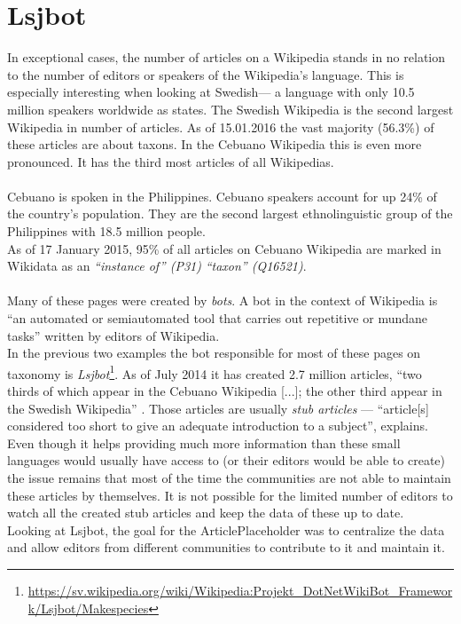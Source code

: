 \section{Lsjbot}
In exceptional cases, the number of articles on a Wikipedia stands in no relation to the number of editors or speakers of the Wikipedia's language. This is especially interesting when looking at Swedish--- a language with only 10.5 million speakers worldwide as \citet{nlpd:01} states. The Swedish Wikipedia is the second largest Wikipedia in number of articles. As of 15.01.2016 the vast majority (56.3\%) of these articles are about taxons.
In the Cebuano Wikipedia this is even more pronounced. It has the third most articles of all Wikipedias. \citep{wiki:07} \\
\\
Cebuano is spoken in the Philippines. Cebuano speakers account for up 24\% of the country's population. \citep{cebuano:01} They are the second largest ethnolinguistic group of the Philippines with 18.5 million people. \citep{cebuano:02} \\
As of 17 January 2015, 95\% of all articles on Cebuano Wikipedia are marked in Wikidata as an \textit{``instance of'' (P31)} \textit{``taxon'' (Q16521)}. \citep{wiki:07} \\
\\
Many of these pages were created by \textit{bots}. A bot in the context of Wikipedia is ``an automated or semiautomated tool that carries out repetitive or mundane tasks'' \citep{wiki:08} written by editors of Wikipedia. \\
In the previous two examples the bot responsible for most of these pages on taxonomy is \textit{Lsjbot}\footnote{\url{https://sv.wikipedia.org/wiki/Wikipedia:Projekt_DotNetWikiBot_Framework/Lsjbot/Makespecies}}. As of July 2014 it has created 2.7 million articles, ``two thirds of which appear in the Cebuano Wikipedia [...]; the other third appear in the Swedish Wikipedia'' \citep{wiki:09}. Those articles are usually \textit{stub articles} --- ``article[s] considered too short to give an adequate introduction to a subject'', \citet{stubs} explains. \\
Even though it helps providing much more information than these small languages would usually have access to (or their editors would be able to create) the issue remains that most of the time the communities are not able to maintain these articles by themselves. It is not possible for the limited number of editors to watch all the created stub articles and keep the data of these up to date. \\
Looking at Lsjbot, the goal for the ArticlePlaceholder was to centralize the data and allow editors from different communities to contribute to it and maintain it.

